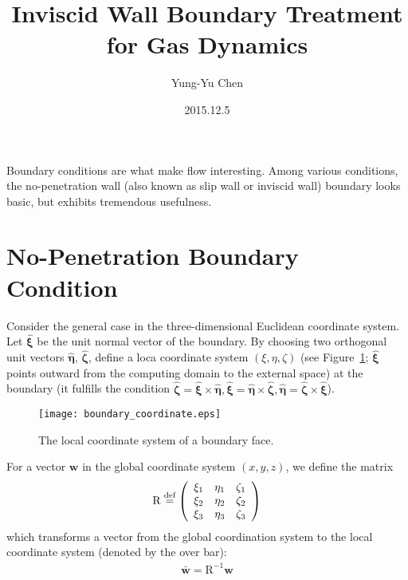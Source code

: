 \documentclass[a4paper,12pt,dvips]{article}
\newcommand*\defeq{\buildrel{\text{def}}\over{=}}
\begin{document}
\title{Inviscid Wall Boundary Treatment for Gas Dynamics}
\author{Yung-Yu Chen}
\date{2015.12.5}

\maketitle

\tableofcontents

\hspace{.5cm}

Boundary conditions are what make flow interesting.  Among various conditions,
the no-penetration wall (also known as slip wall or inviscid wall) boundary
looks basic, but exhibits tremendous usefulness.

\section{No-Penetration Boundary Condition}

Consider the general case in the three-dimensional Euclidean coordinate system.
Let $\hat{\boldsymbol{\xi}}$ be the unit normal vector of the boundary.  By
choosing two orthogonal unit vectors $\hat{\boldsymbol{\eta}}$,
$\hat{\boldsymbol{\zeta}}$, define a loca coordinate system $(\xi, \eta,
\zeta)$ (see Figure~\ref{f:boundary_coordinate}; $\hat{\boldsymbol{\xi}}$
points outward from the computing domain to the external space) at the boundary
(it fulfills the condition $\hat{\boldsymbol{\zeta}} = \hat{\boldsymbol{\xi}}
\times \hat{\boldsymbol{\eta}}, \hat{\boldsymbol{\xi}} =
\hat{\boldsymbol{\eta}} \times \hat{\boldsymbol{\zeta}},
\hat{\boldsymbol{\eta}} = \hat{\boldsymbol{\zeta}} \times
\hat{\boldsymbol{\xi}}$).

\begin{figure}[htbp]
\centering
\texttt{[image: boundary\_coordinate.eps]}
\caption{The local coordinate system of a boundary face.}
\label{f:boundary_coordinate}
\end{figure}

For a vector $\mathbf{w}$ in the global coordinate system $(x, y, z)$, we
define the matrix
\begin{align*}
  \mathrm{R} \defeq \left(\begin{array}{ccc}
    \xi_1 & \eta_1 & \zeta_1 \\
    \xi_2 & \eta_2 & \zeta_2 \\
    \xi_3 & \eta_3 & \zeta_3
  \end{array}\right)
\end{align*}
which transforms a vector from the global coordination system to the local
coordinate system (denoted by the over bar):
\begin{align*}
  \bar{\mathbf{w}} = \mathrm{R}^{-1}\mathbf{w}
\end{align*}
\end{document}
